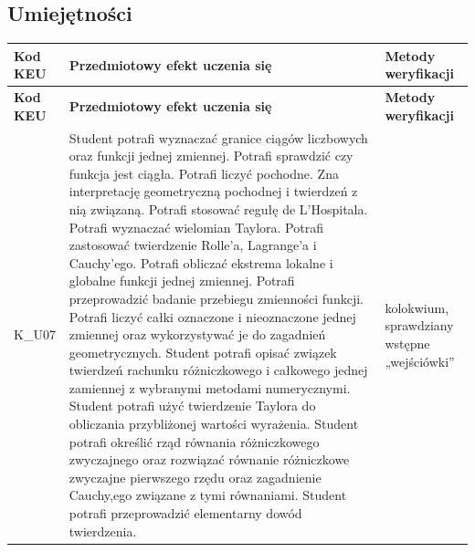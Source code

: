 \documentclass[12pt, a4paper]{article}
\newcommand{\thdrule}{\noalign{\global\setlength{\extrarowheight}{0pt}}}
\newcommand{\thdend}{\noalign{\global\setlength{\extrarowheight}{3pt}}}
\begin{document}
\subsection*{Umiejętności}
{\scriptsize
\begin{longtable}{m{1.6cm}m{9.0cm}m{4.2cm}}
\thdrule\toprule
\rowcolor{pjatkRed} {\color{white}\footnotesize\textbf{\vphantom{Ag}Kod KEU}} & {\color{white}\footnotesize\textbf{\vphantom{Ag}Przedmiotowy efekt uczenia się}} & {\color{white}\footnotesize\textbf{\vphantom{Ag}Metody weryfikacji}} \\
\midrule\thdend
\endfirsthead
\thdrule\toprule
\rowcolor{pjatkRed} {\color{white}\footnotesize\textbf{\vphantom{Ag}Kod KEU}} & {\color{white}\footnotesize\textbf{\vphantom{Ag}Przedmiotowy efekt uczenia się}} & {\color{white}\footnotesize\textbf{\vphantom{Ag}Metody weryfikacji}} \\
\midrule\thdend
\endhead
  \rowcolor{tableRowLight} K\_U07 & Student potrafi wyznaczać granice ciągów liczbowych oraz funkcji jednej zmiennej. Potrafi sprawdzić czy funkcja jest ciągła.  Potrafi liczyć pochodne. Zna interpretację geometryczną pochodnej i twierdzeń z nią związaną. Potrafi stosować  regułę de L'Hospitala. Potrafi  wyznaczać wielomian Taylora.  Potrafi zastosować twierdzenie Rolle’a, Lagrange’a i Cauchy’ego. Potrafi  obliczać ekstrema lokalne i globalne funkcji jednej zmiennej.  Potrafi przeprowadzić badanie przebiegu zmienności funkcji. Potrafi liczyć całki oznaczone i nieoznaczone jednej zmiennej oraz wykorzystywać je do zagadnień geometrycznych. Student potrafi opisać związek twierdzeń rachunku różniczkowego i całkowego jednej zamiennej z wybranymi metodami numerycznymi. Student potrafi użyć twierdzenie Taylora do obliczania przybliżonej wartości wyrażenia. Student potrafi określić rząd równania różniczkowego zwyczajnego oraz rozwiązać równanie różniczkowe zwyczajne pierwszego rzędu oraz zagadnienie Cauchy,ego związane z tymi równaniami. Student potrafi przeprowadzić elementarny dowód twierdzenia. & kolokwium, sprawdziany wstępne „wejściówki'' \\
\bottomrule
\end{longtable}}
\end{document}
